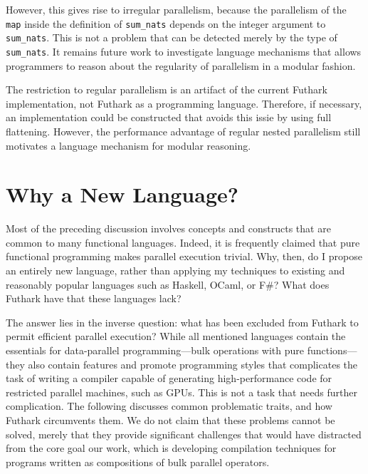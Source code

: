 However, this gives rise to irregular parallelism, because the
parallelism of the \lstinline{map} inside the definition of
\lstinline{sum_nats} depends on the integer argument to
\lstinline{sum_nats}.  This is not a problem that can be detected
merely by the type of \lstinline{sum_nats}.  It remains future work
to investigate language mechanisms that allows programmers to reason
about the regularity of parallelism in a modular fashion.

The restriction to regular parallelism is an artifact of the current
Futhark implementation, not Futhark as a programming language.
Therefore, if necessary, an implementation could be constructed that
avoids this issie by using full flattening.  However, the performance
advantage of regular nested parallelism still motivates a language
mechanism for modular reasoning.

\section{Why a New Language?}
\label{sec:new-language}

Most of the preceding discussion involves concepts and constructs that
are common to many functional languages.  Indeed, it is frequently
claimed that pure functional programming makes parallel execution
trivial.  Why, then, do I propose an entirely new language, rather
than applying my techniques to existing and reasonably popular
languages such as Haskell, OCaml, or F\#?  What does Futhark have that
these languages lack?

The answer lies in the inverse question: what has been excluded from
Futhark to permit efficient parallel execution?  While all mentioned
languages contain the essentials for data-parallel programming---bulk
operations with pure functions---they also contain features and
promote programming styles that complicates the task of writing a
compiler capable of generating high-performance code for restricted
parallel machines, such as GPUs.  This is not a task that needs
further complication.  The following discusses common problematic
traits, and how Futhark circumvents them.  We do not claim that these
problems cannot be solved, merely that they provide significant
challenges that would have distracted from the core goal our work,
which is developing compilation techniques for programs written as
compositions of bulk parallel operators.

